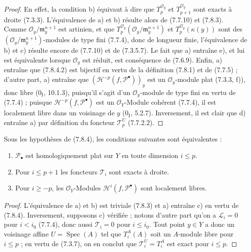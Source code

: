 \begin{proof}
En effet, la condition b) équivaut à dire que $T_p^{\mathscr O_y}$ et
$T_{p+1}^{\mathscr O_y}$ sont exacts à droite (7.3.3). L'équivalence de a) et b)
résulte alors de (7.7.10) et (7.8.3). Comme
$\mathscr O_y/\mathfrak m_y^{n+1}$ est artinien, et que
$T_p^{\mathscr O_y}(\mathscr O_y/\mathfrak m_y^{n+1})$ et
$T_p^{\mathscr O_y}(\kappa(y))$ sont des
$(\mathscr O_y/\mathfrak m_y^{n+1})$-modules de type fini (7.7.4), donc de
longueur finie, l'équivalence de b) et c) résulte encore de (7.7.10) et de
(7.3.5.7). Le fait que a) entraîne e), et lui est équivalente lorsque
$\mathscr O_y$ est réduit, est conséquence de (7.6.9). Enfin, a) entraîne que
(7.8.4.2) est bijectif en vertu de la définition (7.8.1) et de (7.7.5) ; d'autre
part, a) entraîne que $(\mathscr H^{-p}(f,\mathscr P^\bullet))_y$ est un
$\mathscr O_y$-module plat (7.3.3, f)), donc libre ($0_{\mathrm I}$, 10.1.3),
puisqu'il s'agit d'un $\mathscr O_y$-module de type fini en vertu de (7.7.4) ;
puisque $\mathscr H^{-p}(f,\mathscr P^\bullet)$ est un $\mathscr O_Y$-Module
cohérent (7.7.4), il est localement libre dans un voisinage de $y$
($0_{\mathrm I}$, 5.2.7). Inversement, il est clair que d) entraîne a) par
définition du foncteur $\mathscr T_p^U$ (7.7.2.2).
\end{proof}

\begin{proposition}[7.8.5]
Sous les hypothèses de (7.8.4), les conditions suivantes sont équivalentes :
\begin{enumerate}
  \item[a)] $\mathscr P_\bullet$ est homologiquement plat sur $Y$ en toute
    dimension $i\leq p$.
  \item[b)] Pour $i\leq p+1$ les foncteurs $\mathscr T_i$ sont exacts à droite.
  \item[c)] Pour $i\geq-p$, les $\mathscr O_Y$-Modules
    $\mathscr H^i(f,\mathscr P^\bullet)$ sont localement libres.
\end{enumerate}
\end{proposition}

\begin{proof}
L'équivalence de a) et b) est triviale (7.8.3) et a) entraîne c) en vertu de
(7.8.4). Inversement, supposons c) vérifiée ; notons d'autre part qu'on a
$\mathscr L_i=0$ pour $i<i_0$ (7.7.4), donc aussi $\mathscr T_i=0$ pour
$i\leq i_0$. Tout point $y\in Y$ a donc un voisinage affine
$U=\operatorname{Spec}(A)$ tel que $T_i^A(A)$ soit un $A$-module libre pour
$i\leq p$ ; en vertu de (7.3.7), on en conclut que
$\mathscr T_i^U=T_i^A$ est exact pour $i\leq p$.
\end{proof}

